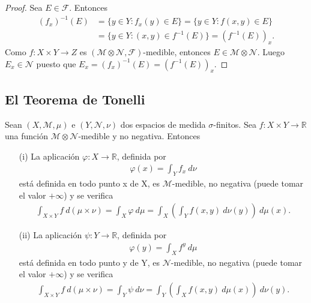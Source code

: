 \begin{proof}
Sea $E \in \mathcal{F}$. Entonces
\begin{align*}
    (f_x)^{-1}(E) &= \{ y \in Y : f_x(y) \in E \} = \{ y \in Y : f(x,y) \in E \} \\
    &= \{ y \in Y : (x,y) \in f^{-1}(E) \} = (f^{-1}(E))_x.
\end{align*}
Como $f: X \times Y \longrightarrow Z$ es $(\mathcal{M} \otimes \mathcal{N}, \mathcal{F})$-medible, entonces $E \in \mathcal{M} \otimes \mathcal{N}$. Luego $E_x \in \mathcal{N}$ puesto que $E_x = (f_x)^{-1}(E) = (f^{-1}(E))_x$.
\end{proof}

\subsection{El Teorema de Tonelli}

\begin{teo}
Sean $(X, \mathcal{M}, \mu)$ e $(Y, \mathcal{N}, \nu)$ dos espacios de medida $\sigma$-finitos. Sea $f: X \times Y \longrightarrow \mathbb{R}$ una función $\mathcal{M} \otimes \mathcal{N}$-medible y no negativa. Entonces
\begin{enumerate}
    \item[(i)] La aplicación $\varphi: X \longrightarrow \mathbb{R}$, definida por
    \begin{align*}
        \varphi(x) = \int_{Y}{f_x \ d\nu}
    \end{align*}
    está definida en todo punto x de X, es $\mathcal{M}$-medible, no negativa (puede tomar el valor $+\infty$) y se verifica
    \begin{align*}
        \int_{X \times Y}{f \ d(\mu \times \nu)} = \int_{X}{\varphi \ d\mu} = \int_{X}\left( \int_{Y}{f(x,y) \ d\nu(y)}\right) \ d\mu(x).
    \end{align*}
    \item[(ii)] La aplicación $\psi: Y \longrightarrow \mathbb{R}$, definida por
    \begin{align*}
        \varphi(y) = \int_{X}{f^y \ d\mu}
    \end{align*}
    está definida en todo punto y de Y, es $\mathcal{N}$-medible, no negativa (puede tomar el valor $+\infty$) y se verifica
    \begin{align*}
        \int_{X \times Y}{f \ d(\mu \times \nu)} = \int_{Y}{\psi \ d\nu} = \int_{Y}\left( \int_{X}{f(x,y) \ d\mu(x)}\right) \ d\nu(y).
    \end{align*}
\end{enumerate}
\end{teo}

